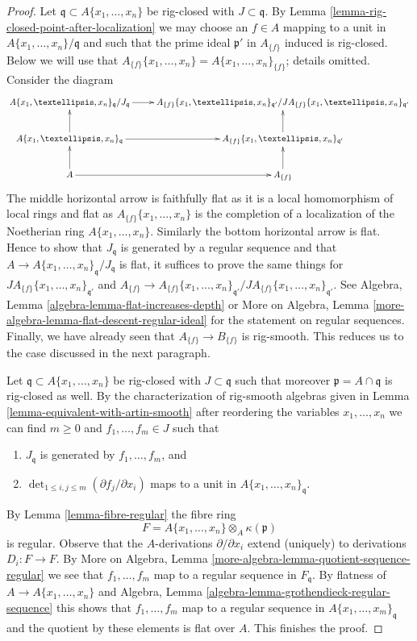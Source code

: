 \documentclass{stacks-project}
\theoremstyle{plain}
\theoremstyle{definition}
\theoremstyle{remark}
\numberwithin{equation}{subsection}
\begin{document}
\begin{proof}
\medskip\noindent
Let $\mathfrak q \subset A\{x_1, \ldots, x_n\}$ be rig-closed with
$J \subset \mathfrak q$. By
Lemma \ref{lemma-rig-closed-point-after-localization}
we may choose an $f \in A$ mapping to a unit in
$A\{x_1, \ldots, x_n\}/\mathfrak q$ and such
that the prime ideal $\mathfrak p'$ in $A_{\{f\}}$ induced is rig-closed.
Below we will use that
$A_{\{f\}}\{x_1, \ldots, x_n\} = A\{x_1, \ldots, x_n\}_{\{f\}}$;
details omitted. Consider the diagram
$$
\xymatrix{
A\{x_1, \ldots, x_n\}_{\mathfrak q} / J_\mathfrak q \ar[r] &
A_{\{f\}}\{x_1, \ldots, x_n\}_{\mathfrak q'}/
J A_{\{f\}}\{x_1, \ldots, x_n\}_{\mathfrak q'} \\
A\{x_1, \ldots, x_n\}_{\mathfrak q} \ar[r] \ar[u] &
A_{\{f\}}\{x_1, \ldots, x_n\}_{\mathfrak q'} \ar[u] \\
A \ar[r] \ar[u] &
A_{\{f\}} \ar[u]
}
$$
The middle horizontal arrow is faithfully flat as it is a local
homomorphism of local rings and flat as $A_{\{f\}}\{x_1, \ldots, x_n\}$
is the completion of a localization of the Noetherian ring
$A\{x_1, \ldots, x_n\}$. Similarly the bottom horizontal arrow is flat.
Hence to show that $J_\mathfrak q$ is generated by a regular sequence
and that $A \to A\{x_1, \ldots, x_n\}_{\mathfrak q} / J_\mathfrak q$
is flat, it suffices to prove the same things for
$J A_{\{f\}}\{x_1, \ldots, x_n\}_{\mathfrak q'}$ and
$A_{\{f\}} \to A_{\{f\}}\{x_1, \ldots, x_n\}_{\mathfrak q'}/
J A_{\{f\}}\{x_1, \ldots, x_n\}_{\mathfrak q'}$.
See Algebra, Lemma \ref{algebra-lemma-flat-increases-depth} or
More on Algebra, Lemma \ref{more-algebra-lemma-flat-descent-regular-ideal}
for the statement on regular sequences. Finally, we have already seen that
$A_{\{f\}} \to B_{\{f\}}$ is rig-smooth.
This reduces us to the case discussed in the next paragraph.

\medskip\noindent
Let $\mathfrak q \subset A\{x_1, \ldots, x_n\}$ be rig-closed with
$J \subset \mathfrak q$ such that moreover $\mathfrak p = A \cap \mathfrak q$
is rig-closed as well. By the characterization of rig-smooth algebras
given in Lemma \ref{lemma-equivalent-with-artin-smooth}
after reordering the variables $x_1, \ldots, x_n$
we can find $m \geq 0$ and $f_1, \ldots, f_m \in J$ such that
\begin{enumerate}
\item $J_\mathfrak q$ is generated by $f_1, \ldots, f_m$, and
\item $\det_{1 \leq i, j \leq m}(\partial f_j/ \partial x_i)$
maps to a unit in $A\{x_1, \ldots, x_n\}_\mathfrak q$.
\end{enumerate}
By Lemma \ref{lemma-fibre-regular} the fibre ring
$$
F = A\{x_1, \ldots, x_n\} \otimes_A \kappa(\mathfrak p)
$$
is regular. Observe that the $A$-derivations $\partial / \partial x_i$
extend (uniquely) to derivations $D_i : F \to F$. By
More on Algebra, Lemma \ref{more-algebra-lemma-quotient-sequence-regular}
we see that $f_1, \ldots, f_m$ map to a regular sequence in
$F_\mathfrak q$. By flatness of $A \to A\{x_1, \ldots, x_n\}$
and Algebra, Lemma \ref{algebra-lemma-grothendieck-regular-sequence}
this shows that $f_1, \ldots, f_m$ map to a regular sequence in
$A\{x_1, \ldots, x_m\}_\mathfrak q$ and the quotient by
these elements is flat over $A$. This finishes the proof.
\end{proof}
\end{document}
